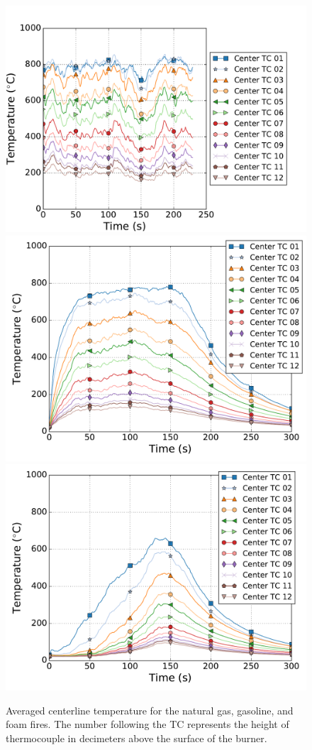 \documentclass[twoside]{uocthesis}
\begin{document}
{\begin{figure}[p]
  \centering
  \includegraphics[width=.625\columnwidth]{../Figures/FHNG_TC_Plume_Avg}\\
  \includegraphics[width=.625\columnwidth]{../Figures/FHGAS_TC_Plume_Avg}\\
  \includegraphics[width=.625\columnwidth]{../Figures/FHPUF_TC_Plume_Avg}\\
  \caption[Averaged centerline temperature for the natural gas, gasoline, and foam fires]{Averaged centerline temperature for the natural gas, gasoline, and foam fires. The number following the TC represents the height of thermocouple in decimeters above the surface of the burner.}
  \label{Temp}
\end{figure}


}
\end{document}

